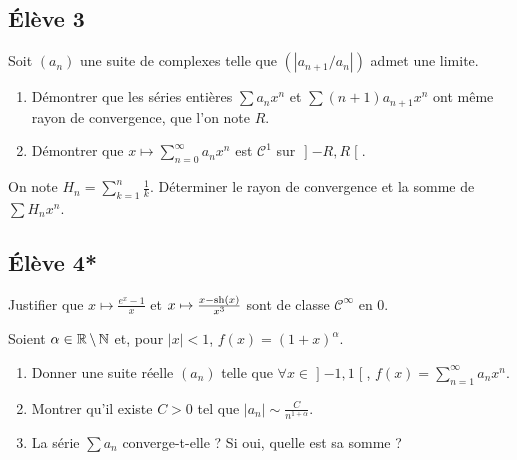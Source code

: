 \documentclass[10pt]{scrartcl}
\begin{document}
    \subsection*{Élève 3}

    \begin{ccp}
        Soit $(a_n)$ une suite de complexes telle que $(|a_{n+1}/a_n|)$ admet une limite.
        \begin{enumerate}
            \item Démontrer que les séries entières $\sum a_nx^n$ et $\sum(n+1)a_{n+1}x^n$ ont même rayon de convergence, que l'on note $R$. 
            \item Démontrer que $x\mapsto \sum_{n=0}^\infty a_nx^n$ est $\mathcal C^1$ sur $\mathopen]-R,R\mathclose[$.
        \end{enumerate}
    \end{ccp}

    \begin{exo}
        On note $H_n=\sum_{k=1}^n\frac 1k$. 
        Déterminer le rayon de convergence et la somme de $\sum H_nx^n$.
    \end{exo}

    \newpage
    \subsection*{Élève 4*}
    \begin{qc}
        Justifier que $x\mapsto \frac{e^x-1}x$ et  $x\mapsto \frac{x-\operatorname{sh}(x)}{x^3}$ sont de classe $\mathcal C^\infty$ en $0$.
    \end{qc}

    \begin{exo}
        Soient $\alpha\in\operatorname{\mathbb R}\backslash \operatorname{\mathbb N}$ et, pour $|x|<1$, $f(x)=(1+x)^\alpha$.
        \begin{enumerate}
            \item Donner une suite réelle $(a_n)$ telle que $\forall x\in\mathopen]-1,1\mathclose[$, $f(x)=\sum_{n=1}^\infty a_nx^n$.
            \item Montrer qu'il existe $C>0$ tel que $|a_n|\sim \frac{C}{n^{1+\alpha}}$.
            \item La série $\sum a_n$ converge-t-elle ? Si oui, quelle est sa somme ?
        \end{enumerate}
    \end{exo}
\end{document}
